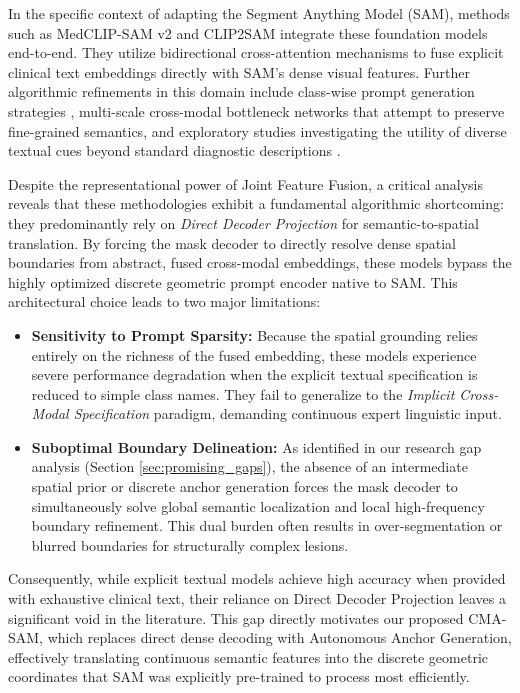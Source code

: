 \documentclass[onecolumn]{IEEEtran}
\numberwithin{equation}{section}
\theoremstyle{definition}
\theoremstyle{remark}
\begin{document}
In the specific context of adapting the Segment Anything Model (SAM), methods such as MedCLIP-SAM v2 \cite{koleilat2025medclip} and CLIP2SAM \cite{sun2024clip2sam} integrate these foundation models end-to-end. They utilize bidirectional cross-attention mechanisms to fuse explicit clinical text embeddings directly with SAM's dense visual features. Further algorithmic refinements in this domain include class-wise prompt generation strategies \cite{pu2025classwise}, multi-scale cross-modal bottleneck networks \cite{zhang2025mcbtnet} that attempt to preserve fine-grained semantics, and exploratory studies investigating the utility of diverse textual cues beyond standard diagnostic descriptions \cite{lin2024beyond, wang2024use}.

Despite the representational power of Joint Feature Fusion, a critical analysis reveals that these methodologies exhibit a fundamental algorithmic shortcoming: they predominantly rely on \textit{Direct Decoder Projection} for semantic-to-spatial translation. By forcing the mask decoder to directly resolve dense spatial boundaries from abstract, fused cross-modal embeddings, these models bypass the highly optimized discrete geometric prompt encoder native to SAM. This architectural choice leads to two major limitations:
\begin{itemize}
    \item \textbf{Sensitivity to Prompt Sparsity:} Because the spatial grounding relies entirely on the richness of the fused embedding, these models experience severe performance degradation when the explicit textual specification is reduced to simple class names. They fail to generalize to the \textit{Implicit Cross-Modal Specification} paradigm, demanding continuous expert linguistic input.
    \item \textbf{Suboptimal Boundary Delineation:} As identified in our research gap analysis (Section \ref{sec:promising_gaps}), the absence of an intermediate spatial prior or discrete anchor generation forces the mask decoder to simultaneously solve global semantic localization and local high-frequency boundary refinement. This dual burden often results in over-segmentation or blurred boundaries for structurally complex lesions.
\end{itemize}

Consequently, while explicit textual models \cite{koleilat2025medclip, li2024clipsam} achieve high accuracy when provided with exhaustive clinical text, their reliance on Direct Decoder Projection leaves a significant void in the literature. This gap directly motivates our proposed CMA-SAM, which replaces direct dense decoding with Autonomous Anchor Generation, effectively translating continuous semantic features into the discrete geometric coordinates that SAM was explicitly pre-trained to process most efficiently.
\end{document}
